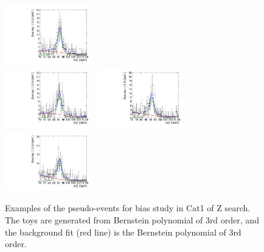\begin{figure}[!ht]
  \includegraphics[width=0.33\textwidth]{Fig/BiasStudy/Toys/ZJpsiG_Cat1/TruePdf2_FitPdf2_mu200_sbfit_12314_cat1}\\
  \includegraphics[width=0.33\textwidth]{Fig/BiasStudy/Toys/ZJpsiG_Cat1/TruePdf2_FitPdf2_mu200_sbfit_12319_cat1}~
  \includegraphics[width=0.33\textwidth]{Fig/BiasStudy/Toys/ZJpsiG_Cat1/TruePdf2_FitPdf2_mu200_sbfit_12321_cat1}~
  \includegraphics[width=0.33\textwidth]{Fig/BiasStudy/Toys/ZJpsiG_Cat1/TruePdf2_FitPdf2_mu200_sbfit_1237_cat1}\\
  \caption{Examples of the pseudo-events for bias study in Cat1 of Z search. The toys are generated from Bernstein polynomial of 3rd order, and the background fit (red line) is the Bernstein polynomial of 3rd order.}
  \label{fig:Toys_ZJpsiG_Cat1}
\end{figure}
\clearpage


